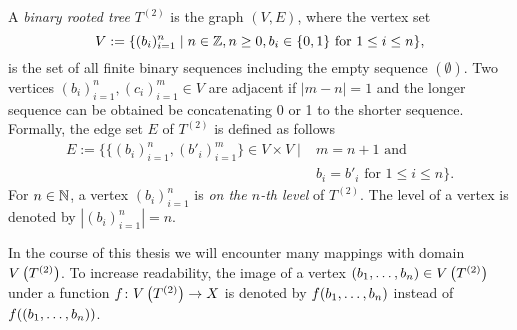 
\begin{defin}
A \emph{binary rooted tree} $T^{(2)}$ is the graph $(V,E)$, where the vertex set 
\begin{equation*}
V:=\lbrace (b_i)_{i=1}^n\mid n\in \operatorname{\mathbb{Z}}, n\geq 0, b_i\in\lbrace 0,1\rbrace\text{ for }1\leq i\leq n\rbrace,
\end{equation*}
is the set of all finite binary sequences including the empty sequence $(\emptyset)$. Two vertices $(b_i)_{i=1}^n,(c_i)_{i=1}^m\in V$ are adjacent if $|m-n|=1$ and the longer sequence can be obtained be concatenating 0 or 1 to the shorter sequence. Formally, the edge set $E$ of $T^{(2)}$ is defined as follows
\begin{align*}
E:=\lbrace \lbrace(b_i)_{i=1}^n,(b'_i)_{i=1}^m\rbrace\in V\times V\mid& m=n+1\text{ and }\\
& b_i=b'_i\text{ for } 1\leq i\leq n\rbrace.
\end{align*}
For $n\in\operatorname{\mathbb{N}}$, a vertex $(b_i)_{i=1}^n$ is \emph{on the $n$-th level} of $T^{(2)}$. The level of a vertex  is denoted by $|(b_i)_{i=1}^n|=n.$
\end{defin}
In the course of this thesis we will encounter many mappings with domain $V\left(T^{(2)}\right)$. To increase readability, the image of a vertex $(b_{1},\ldots,b_{n})\in V\left(T^{(2)}\right)$ under a function $f\colon V\left(T^{(2)}\right)\to X$ is denoted by $f(b_{1},\ldots,b_{n})$ instead of $f((b_{1},\ldots,b_{n}))$.


